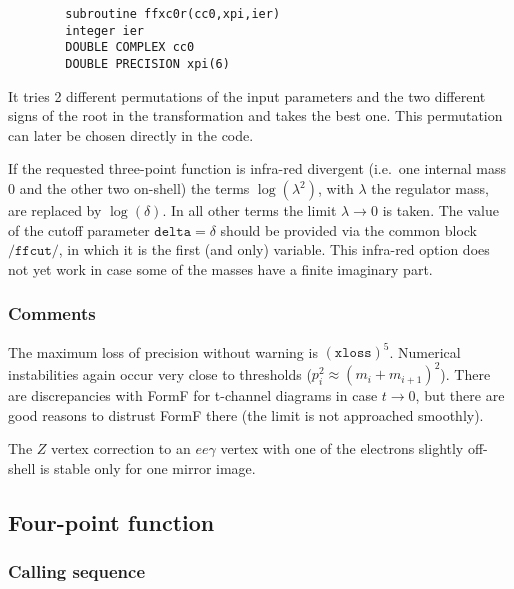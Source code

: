 \documentclass[twoside,12pt]{report}
\def\ie{i.e.\ }
\def\Code#1{\ensuremath{\texttt{#1}}}
\begin{document}
\begin{appendix}
\begin{verbatim}
        subroutine ffxc0r(cc0,xpi,ier)
        integer ier
        DOUBLE COMPLEX cc0
        DOUBLE PRECISION xpi(6)
\end{verbatim}
It tries 2 different permutations of the input parameters and the two 
different signs of the root in the transformation and takes the best one.  
This permutation can later be chosen directly in the code.

If the requested three-point function is infra-red divergent (\ie one 
internal mass 0 and the other two on-shell) the terms $\log(\lambda^2)$, 
with $\lambda$ the regulator mass, are replaced by $\log(\delta)$.  In 
all other terms the limit $\lambda \to 0$ is taken.  The value of the 
cutoff parameter $\Code{delta} = \delta$ should be provided via the 
common block \Code{/ffcut/}, in which it is the first (and only) 
variable.  This infra-red option does not yet work in case some of the 
masses have a finite imaginary part.

\subsubsection{Comments}

The maximum loss of precision without warning is $(\Code{xloss})^5$.  
Numerical instabilities again occur very close to thresholds ($p_i^2 \approx 
(m_i + m_{i+1})^2$).  There are discrepancies with FormF for t-channel 
diagrams in case $t \to 0$, but there are good reasons to distrust FormF 
there (the limit is not approached smoothly).

The $Z$ vertex correction to an $ee\gamma$ vertex with one of the electrons 
slightly off-shell is stable only for one mirror image.

\subsection{Four-point function}

\subsubsection{Calling sequence}


\end{appendix}
\end{document}
